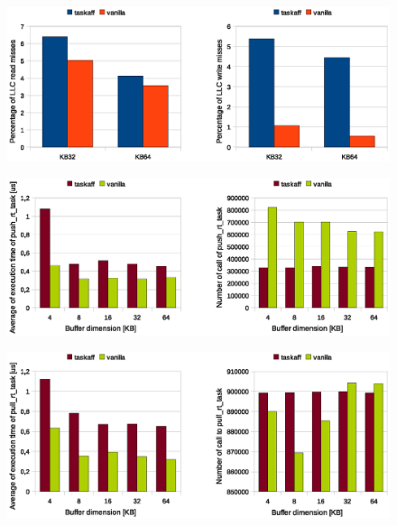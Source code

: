 \begin{figure}[htbp]
\centering
\includegraphics[width=\widefigure]{images/results_xeon/l2_load_store_xeon.eps}
\caption{}
\label{fig:l2_load_store_xeon}
\end{figure}

\begin{figure}[htbp]
\centering
\includegraphics[width=\widefigure]{images/results_xeon/push_xeon.eps}
\caption{}
\label{fig:push_xeon}
\end{figure}

\begin{figure}[htbp]
\centering
\includegraphics[width=\widefigure]{images/results_xeon/pull_xeon.eps}
\caption{}
\label{fig:pull_xeon}
\end{figure}

